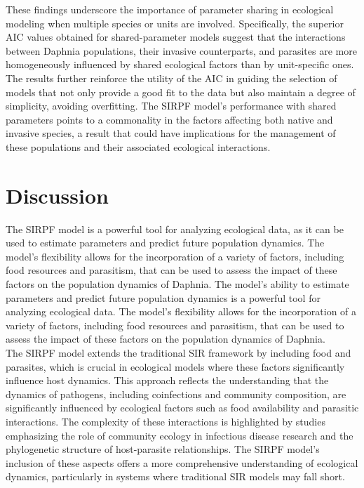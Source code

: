 \documentclass[12pt]{article}
\begin{document}
These findings underscore the importance of parameter sharing in ecological modeling when multiple species or units are involved. Specifically, the superior AIC values obtained for shared-parameter models suggest that the interactions between Daphnia populations, their invasive counterparts, and parasites are more homogeneously influenced by shared ecological factors than by unit-specific ones. The results further reinforce the utility of the AIC in guiding the selection of models that not only provide a good fit to the data but also maintain a degree of simplicity, avoiding overfitting. The SIRPF model's performance with shared parameters points to a commonality in the factors affecting both native and invasive species, a result that could have implications for the management of these populations and their associated ecological interactions.\\

\section{Discussion}
\label{sec:dis}

The SIRPF model is a powerful tool for analyzing ecological data, as it can be used to estimate parameters and predict future population dynamics. The model's flexibility allows for the incorporation of a variety of factors, including food resources and parasitism, that can be used to assess the impact of these factors on the population dynamics of Daphnia. The model's ability to estimate parameters and predict future population dynamics is a powerful tool for analyzing ecological data. The model's flexibility allows for the incorporation of a variety of factors, including food resources and parasitism, that can be used to assess the impact of these factors on the population dynamics of Daphnia.\\

The SIRPF model extends the traditional SIR framework by including food and parasites, which is crucial in ecological models where these factors significantly influence host dynamics. This approach reflects the understanding that the dynamics of pathogens, including coinfections and community composition, are significantly influenced by ecological factors such as food availability and parasitic interactions. The complexity of these interactions is highlighted by studies emphasizing the role of community ecology in infectious disease research and the phylogenetic structure of host-parasite relationships. The SIRPF model's inclusion of these aspects offers a more comprehensive understanding of ecological dynamics, particularly in systems where traditional SIR models may fall short.\\
\end{document}
